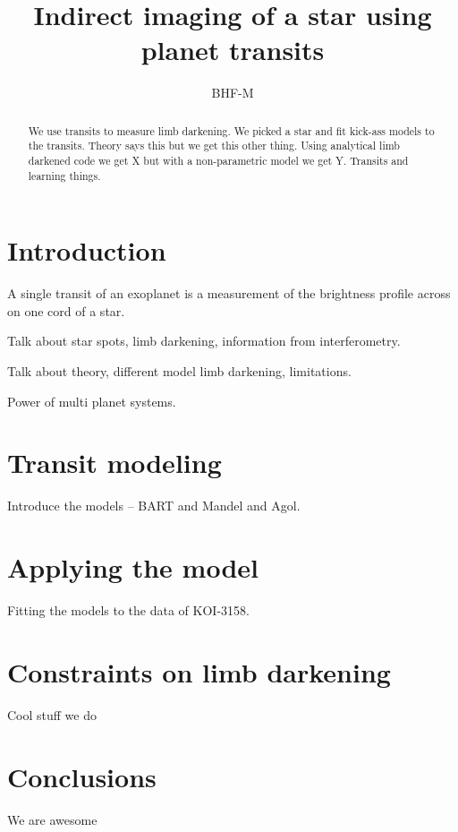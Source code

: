 \documentclass[iop]{emulateapj}
\begin{document}

\title{Indirect imaging of a star using planet transits}
\author{
BHF-M
}


\begin{abstract}
We use transits to measure limb darkening. We picked a star and fit kick-ass models to the transits. Theory says this but we get this other thing. Using analytical limb darkened code we get X but with a non-parametric model we get Y. Transits and learning things. 
\end{abstract}

\section{Introduction}
A single transit of an exoplanet is a measurement of the brightness profile across on one cord of a star. 

Talk about star spots, limb darkening, information from interferometry. 

Talk about theory, different model limb darkening, limitations.

Power of multi planet systems.


\section{Transit modeling}
Introduce the models -- BART and Mandel and Agol.

\section{Applying the model}
Fitting the models to the data of KOI-3158.



\section{Constraints on limb darkening}
Cool stuff we do

\section{Conclusions}
We are awesome
\end{document}
